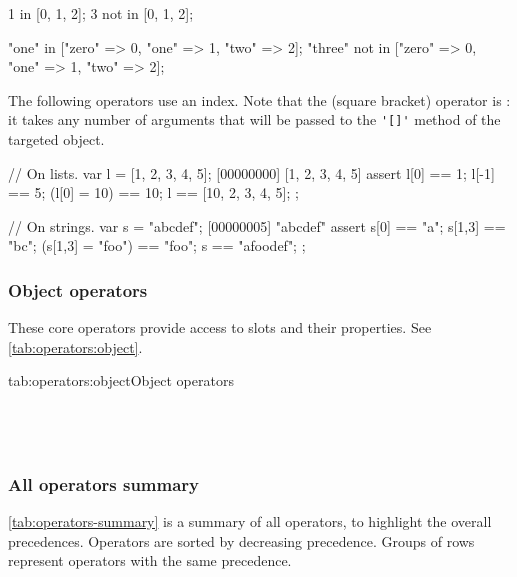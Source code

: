 \begin{urbiassert}
1     in [0, 1, 2];
3 not in [0, 1, 2];

"one"   in     ["zero" => 0, "one" => 1, "two" => 2];
"three" not in ["zero" => 0, "one" => 1, "two" => 2];
\end{urbiassert}

The following operators use an index. Note that the
 (square bracket) operator is
: it takes any number of arguments that will be passed
to the \lstinline|'[]'| method of the targeted object.

\begin{urbiscript}
// On lists.
var l = [1, 2, 3, 4, 5];
[00000000] [1, 2, 3, 4, 5]
assert
{
  l[0] == 1;
  l[-1] == 5;
  (l[0] = 10) == 10;
  l == [10, 2, 3, 4, 5];
};

// On strings.
var s = "abcdef";
[00000005] "abcdef"
assert
{
  s[0] == "a";
  s[1,3] == "bc";
  (s[1,3] = "foo") == "foo";
  s == "afoodef";
};
\end{urbiscript}


\subsubsection{Object operators}

These core operators provide access to slots and their properties. See
\autoref{tab:operators:object}.

\begin{operatorTable}{tab:operators:object}{Object operators}
  \operatordot\\
  \operatordota\\
  \hline
  \operatorprop\\
  \operatorpropass\\
\end{operatorTable}

\subsubsection{All operators summary}

\autoref{tab:operators-summary} is a summary of all operators, to
highlight the overall precedences. Operators are sorted by decreasing
precedence. Groups of rows represent operators with the same
precedence.

